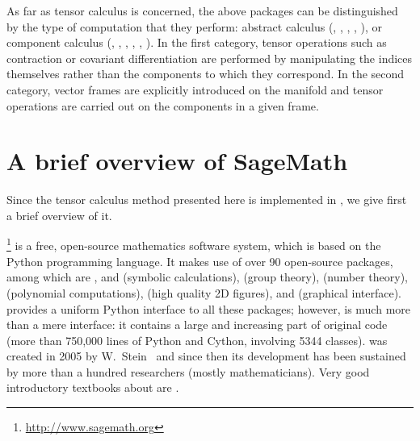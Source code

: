 As far as tensor calculus is concerned, the above packages can be distinguished by
the type of computation that they perform:
abstract calculus (, , ,
, ),
or component calculus (, , ,
, , ).
In the first category, tensor operations such as contraction or covariant differentiation
are performed by manipulating the indices themselves rather than the components
to which they correspond. In the second category, vector frames are explicitly
introduced on the manifold and tensor operations are carried out on the components
in a given frame.



\section{A brief overview of SageMath} \label{s:int:overview_Sage}

Since the tensor calculus method presented here is implemented in \Sage{}, we
give first a brief overview of it.

\Sage{}\footnote{\url{http://www.sagemath.org}} is a free, open-source mathematics software system, which is
based on the Python programming language. It makes use of over 90 open-source packages,
among which are ,  and  (symbolic calculations),
 (group theory),
 (number theory),  (polynomial computations),
 (high quality 2D figures), and  (graphical interface).
\Sage{} provides a uniform Python interface to all these packages; however,
\Sage{} is much more than a mere interface: it contains a large and increasing part of
original code (more than 750,000 lines of Python and Cython, involving 5344 classes).
\Sage{} was created in 2005 by W.~Stein~\cite{SteinJ05} and since
then its development has been sustained by more than a hundred researchers
(mostly mathematicians). Very good introductory textbooks about \Sage{} are
\cite{JoyneS14,Zimme13,Zimme18,Bard15}.

